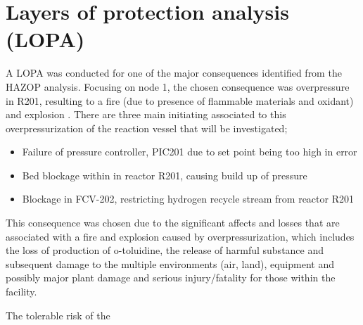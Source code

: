\section{Layers of protection analysis (LOPA)}

A LOPA was conducted for one of the major consequences identified from the HAZOP analysis. Focusing on node 1, the chosen consequence was overpressure in R201, resulting to a fire (due to presence of flammable materials and oxidant) and explosion . There are three main initiating associated to this overpressurization of the reaction vessel that will be investigated;

\begin{itemize}
\item Failure of pressure controller, PIC201 due to set point being too high in error
\item Bed blockage within in reactor R201, causing build up of pressure
\item Blockage in FCV-202, restricting hydrogen recycle stream from reactor R201

\end{itemize}
This consequence was chosen due to the significant affects and losses that are associated with a fire and explosion caused by overpressurization, which includes the loss of production of o-toluidine, the release of harmful substance and subsequent damage to the multiple environments (air, land), equipment and possibly major plant damage and serious injury/fatality for those within the facility. 

The tolerable risk of the 

 